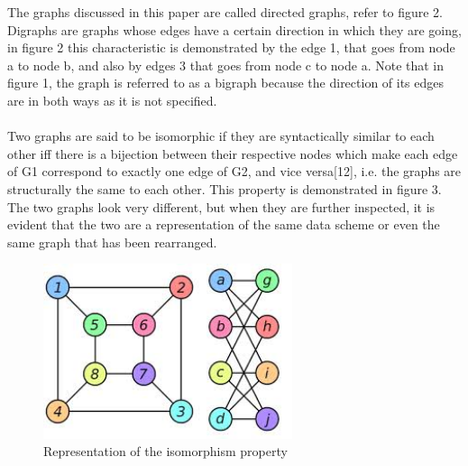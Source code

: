 The graphs discussed in this paper are called directed graphs, refer to figure 2. Digraphs are graphs whose edges have a certain direction in which they are going, in figure 2 this characteristic is demonstrated by the edge 1, that goes from node a to node b, and also by edges 3 that goes from node c to node a. Note that in figure 1, the graph is referred to as a bigraph because the direction of its edges are in both ways as it is not specified.\\\\
Two graphs are said to be isomorphic if they are syntactically similar to each other iff there is a bijection between their respective nodes which make each edge of G1 correspond to exactly one edge of G2, and vice versa[12], i.e. the graphs are structurally the same to each other. This property is demonstrated in figure 3. The two graphs look very different, but when they are further inspected, it is evident that the two are a representation of the same data scheme or even the same graph that has been rearranged.

\begin{figure}[H]
  \begin{center}
      \includegraphics[width=0.65\textwidth]{isomorphism.PNG}
  \end{center}    
  \caption{Representation of the isomorphism property}
\end{figure}

